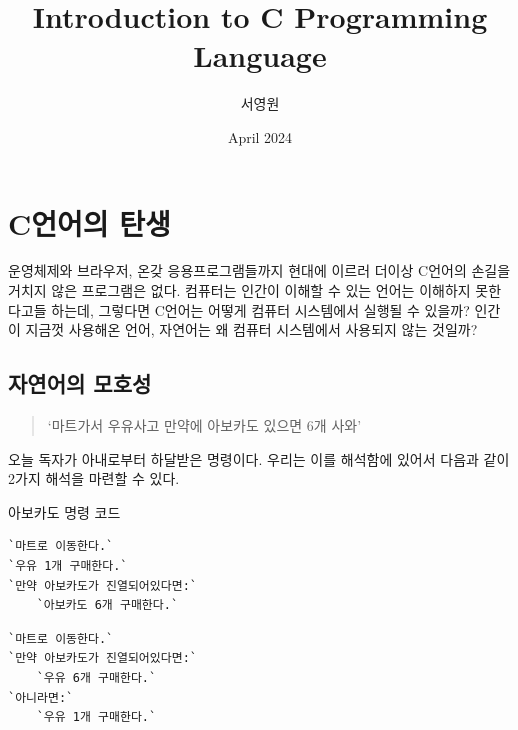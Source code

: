 \documentclass{article}
\title{Introduction to C Programming Language}
\author{서영원}
\date{April 2024}
\begin{document}
\maketitle

\tableofcontents

\vfill
\doclicenseThis


\pagebreak

\section{C언어의 탄생}

운영체제와 브라우저, 온갖 응용프로그램들까지 현대에 이르러 더이상
C언어의 손길을 거치지 않은 프로그램은 없다.
컴퓨터는 인간이 이해할 수 있는 언어는 이해하지 못한다고들 하는데,
그렇다면 C언어는 어떻게 컴퓨터 시스템에서 실행될 수 있을까?
인간이 지금껏 사용해온 언어, 자연어는 왜 컴퓨터 시스템에서 사용되지 않는
것일까?

\subsection{자연어의 모호성}

\begin{quote}
`마트가서 우유사고 만약에 아보카도 있으면 6개 사와'
\end{quote}

오늘 독자가 아내로부터 하달받은 명령이다.
우리는 이를 해석함에 있어서 다음과 같이 2가지 해석을 마련할 수 있다.

\begin{center}

    \centering

    아보카도 명령 코드

    \begin{minipage}{0.45\textwidth}
        \begin{lstlisting}[escapeinside=``]
`마트로 이동한다.`
`우유 1개 구매한다.`
`만약 아보카도가 진열되어있다면:`
    `아보카도 6개 구매한다.`
        \end{lstlisting}
    \end{minipage}
    \hfill
    \begin{minipage}{0.45\textwidth}
        \begin{lstlisting}[escapeinside=``]
`마트로 이동한다.`
`만약 아보카도가 진열되어있다면:`
    `우유 6개 구매한다.`
`아니라면:`
    `우유 1개 구매한다.`
        \end{lstlisting}
    \end{minipage}

\end{center}
\end{document}
